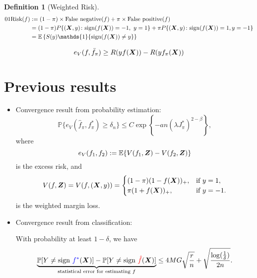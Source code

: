 \documentclass[11pt]{article}
\theoremstyle{plain}
\theoremstyle{definition}
\newtheorem{defn}{Definition}
\newcommand*{\KeepStyleUnderBrace}[1]{%
  \mathop{%
    \mathchoice
    {\underbrace{\displaystyle#1}}%
    {\underbrace{\textstyle#1}}%
    {\underbrace{\scriptstyle#1}}%
    {\underbrace{\scriptscriptstyle#1}}%
  }\limits
}
\begin{document}
\begin{defn}[Weighted Risk]
\begin{align}
\text{01Risk}(f)&:=(1-\pi)\times \text{False negative}(f)+\pi \times \text{False positive}(f)\\
&=(1-\pi)P\{(\mX,y)\colon \mathrm{sign}(f(\mX))=-1,\ y=1\}+\pi P\{(\mX,y)\colon \mathrm{sign}(f(\mX))=1, y=-1\}\\
&=\mathbb{E}\left\{S(y)\mathds{1}\{\mathrm{sign}(f(\mX))\neq y\}\right\}
\end{align}
\end{defn}

\[
e_V(f,\bar f_\pi) \geq R(yf(\bm X)) - R(yf_\pi(\bm X))
\]
\section{Previous results}\label{sec:1}
\begin{itemize}
\item Convergence result from probability estimation:
\[
\mathbb{P}\{e_V(\hat f_\pi,f^*_\pi)\geq \delta_n\}\leq C\exp\left\{ -an(\lambda J^*_\pi)^{2-\beta}\right\},
\]
where 
\[
e_V(f_1, f_2) := \mathbb{E}\{V(f_1,\bm Z)-V(f_2,\bm Z)\}
\]
is the excess risk, and 
\[
V(f,\bm Z)=V(f,(\bm X,y))=
\begin{cases}
(1-\pi)(1-f(\bm X))_{+},& \text{if $y=1$},\\
\pi(1+f(\bm X))_{+},& \text{if $y=-1$}.
\end{cases}
\]
is the weighted margin loss. 
\item Convergence result from classification:

With probability at least $1-\delta$, we have
\[
\KeepStyleUnderBrace{\mathbb{P}[Y\neq \text{sign }{\color{blue}f^*}(\mX)] - \mathbb{P}[Y\neq \text{sign } {\color{red}\hat f}(\mX)]}_{\text{statistical error for estimating $f$}}\leq 4MG\sqrt{r\over n}+\sqrt{\log({1\over \delta})\over 2n}.
\]
\end{itemize}
\end{document}
